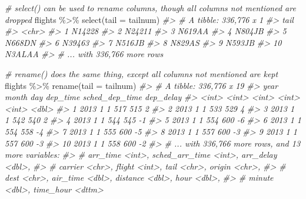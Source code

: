 \documentclass[
]{book}
\newenvironment{Shaded}{\begin{snugshade}}{\end{snugshade}}
\newcommand{\AttributeTok}[1]{\textcolor[rgb]{0.77,0.63,0.00}{#1}}
\newcommand{\CommentTok}[1]{\textcolor[rgb]{0.56,0.35,0.01}{\textit{#1}}}
\newcommand{\FunctionTok}[1]{\textcolor[rgb]{0.00,0.00,0.00}{#1}}
\newcommand{\NormalTok}[1]{#1}
\newcommand{\SpecialCharTok}[1]{\textcolor[rgb]{0.00,0.00,0.00}{#1}}
\begin{document}
\begin{Shaded}
\begin{Highlighting}[]
\CommentTok{\# select() can be used to rename columns, though all columns not mentioned are dropped}
\NormalTok{flights }\SpecialCharTok{\%\textgreater{}\%} \FunctionTok{select}\NormalTok{(}\AttributeTok{tail =}\NormalTok{ tailnum)}
\CommentTok{\#\textgreater{} \# A tibble: 336,776 x 1}
\CommentTok{\#\textgreater{}    tail  }
\CommentTok{\#\textgreater{}    \textless{}chr\textgreater{} }
\CommentTok{\#\textgreater{}  1 N14228}
\CommentTok{\#\textgreater{}  2 N24211}
\CommentTok{\#\textgreater{}  3 N619AA}
\CommentTok{\#\textgreater{}  4 N804JB}
\CommentTok{\#\textgreater{}  5 N668DN}
\CommentTok{\#\textgreater{}  6 N39463}
\CommentTok{\#\textgreater{}  7 N516JB}
\CommentTok{\#\textgreater{}  8 N829AS}
\CommentTok{\#\textgreater{}  9 N593JB}
\CommentTok{\#\textgreater{} 10 N3ALAA}
\CommentTok{\#\textgreater{} \# ... with 336,766 more rows}

\CommentTok{\# rename() does the same thing, except all columns not mentioned are kept}
\NormalTok{flights }\SpecialCharTok{\%\textgreater{}\%} \FunctionTok{rename}\NormalTok{(}\AttributeTok{tail =}\NormalTok{ tailnum)}
\CommentTok{\#\textgreater{} \# A tibble: 336,776 x 19}
\CommentTok{\#\textgreater{}     year month   day dep\_time sched\_dep\_time dep\_delay}
\CommentTok{\#\textgreater{}    \textless{}int\textgreater{} \textless{}int\textgreater{} \textless{}int\textgreater{}    \textless{}int\textgreater{}          \textless{}int\textgreater{}     \textless{}dbl\textgreater{}}
\CommentTok{\#\textgreater{}  1  2013     1     1      517            515         2}
\CommentTok{\#\textgreater{}  2  2013     1     1      533            529         4}
\CommentTok{\#\textgreater{}  3  2013     1     1      542            540         2}
\CommentTok{\#\textgreater{}  4  2013     1     1      544            545        {-}1}
\CommentTok{\#\textgreater{}  5  2013     1     1      554            600        {-}6}
\CommentTok{\#\textgreater{}  6  2013     1     1      554            558        {-}4}
\CommentTok{\#\textgreater{}  7  2013     1     1      555            600        {-}5}
\CommentTok{\#\textgreater{}  8  2013     1     1      557            600        {-}3}
\CommentTok{\#\textgreater{}  9  2013     1     1      557            600        {-}3}
\CommentTok{\#\textgreater{} 10  2013     1     1      558            600        {-}2}
\CommentTok{\#\textgreater{} \# ... with 336,766 more rows, and 13 more variables:}
\CommentTok{\#\textgreater{} \#   arr\_time \textless{}int\textgreater{}, sched\_arr\_time \textless{}int\textgreater{}, arr\_delay \textless{}dbl\textgreater{},}
\CommentTok{\#\textgreater{} \#   carrier \textless{}chr\textgreater{}, flight \textless{}int\textgreater{}, tail \textless{}chr\textgreater{}, origin \textless{}chr\textgreater{},}
\CommentTok{\#\textgreater{} \#   dest \textless{}chr\textgreater{}, air\_time \textless{}dbl\textgreater{}, distance \textless{}dbl\textgreater{}, hour \textless{}dbl\textgreater{},}
\CommentTok{\#\textgreater{} \#   minute \textless{}dbl\textgreater{}, time\_hour \textless{}dttm\textgreater{}}
\end{Highlighting}
\end{Shaded}
\end{document}
